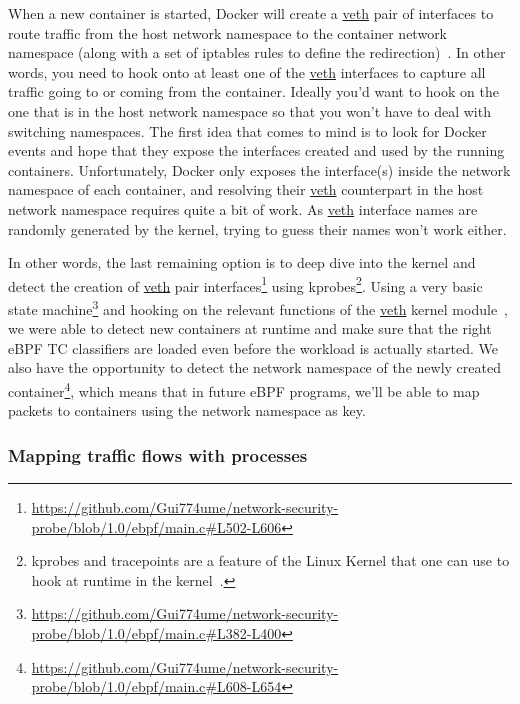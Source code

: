 When a new container is started, Docker will create a \url{veth} pair of interfaces to route traffic from the host network namespace to the container network namespace (along with a set of iptables rules to define the redirection)~\cite{ProcessLevelNetworkSecurityMonitoring:JonLangemak}. In other words, you need to hook onto at least one of the \url{veth} interfaces to capture all traffic going to or coming from the container. Ideally you’d want to hook on the one that is in the host network namespace so that you won’t have to deal with switching namespaces. The first idea that comes to mind is to look for Docker events and hope that they expose the interfaces created and used by the running containers. Unfortunately, Docker only exposes the interface(s) inside the network namespace of each container, and resolving their \url{veth} counterpart in the host network namespace requires quite a bit of work. As \url{veth} interface names are randomly generated by the kernel, trying to guess their names won’t work either.

In other words, the last remaining option is to deep dive into the kernel and detect the creation of \url{veth} pair interfaces\footnote{\url{https://github.com/Gui774ume/network-security-probe/blob/1.0/ebpf/main.c#L502-L606}} using kprobes\footnote{kprobes and tracepoints are a feature of the Linux Kernel that one can use to hook at runtime in the kernel~\cite{ProcessLevelNetworkSecurityMonitoring:KernelProbesDoc}.}. Using a very basic state machine\footnote{\url{https://github.com/Gui774ume/network-security-probe/blob/1.0/ebpf/main.c#L382-L400}} and hooking on the relevant functions of the \url{veth} kernel module~\cite{ProcessLevelNetworkSecurityMonitoring:GregKroahHartmanAlessandroRubiniJonathanCorbet}, we were able to detect new containers at runtime and make sure that the right eBPF TC classifiers are loaded even before the workload is actually started. We also have the opportunity to detect the network namespace of the newly created container\footnote{\url{https://github.com/Gui774ume/network-security-probe/blob/1.0/ebpf/main.c#L608-L654}}, which means that in future eBPF programs, we’ll be able to map packets to containers using the network namespace as key.

\newpage

\subsubsection{Mapping traffic flows with processes}

